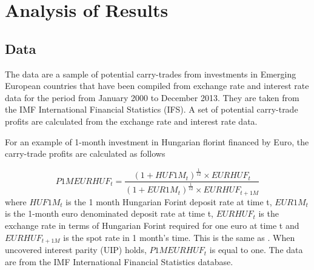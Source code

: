 \documentclass[12pt, a4paper, oneside]{article}\usepackage[]{graphicx}\usepackage[]{color}
\begin{document}






\section{Analysis of Results}\label{secref:res}
\subsection{Data}
The data are a sample of potential carry-trades from investments in Emerging European countries that have been compiled from exchange rate and interest rate data for the period from January 2000 to December 2013. They are taken from the IMF International Financial Statistics (IFS).  A set of potential carry-trade profits are calculated from the exchange rate and interest rate data.  

For an example of 1-month investment in Hungarian florint financed by Euro, the carry-trade profits are calculated as follows

\begin{equation}\label{eqref:carryprofit}
P1MEURHUF_t = \frac{(1 + HUF1M_t)^{\frac{1}{12}} \times EURHUF_t }{(1 + EUR1M_t)^{\frac{1}{12}} \times EURHUF_{t+1M}}
\end{equation}
where $HUF1M_t$ is the 1 month Hungarian Forint deposit rate at time t, $EUR1M_t$ is the 1-month euro denominated deposit rate at time t, $EURHUF_t$ is the exchange rate in terms of  Hungarian Forint required for one euro at time t and  $EURHUF_{t+1M}$ is the spot rate in 1 month's time.  This is the same as \citep{BrunnermeierCarry}. When uncovered interest parity (UIP) holds, $P1MEURHUF_t$ is equal to one.  The data are from the IMF International Financial Statistics database. 
\end{document}
